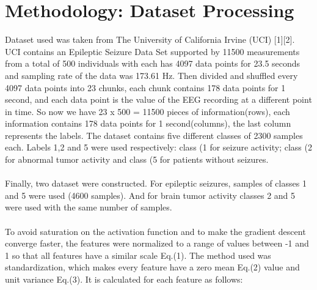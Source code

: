 \documentclass{llncs}       %
\begin{document}
\paragraph{}
\paragraph{}
\paragraph{}



\paragraph{}
\section{Methodology: Dataset Processing}
\label{sec:2}

Dataset used was taken from The University of California Irvine (UCI) [1][2].  UCI contains an Epileptic Seizure Data Set supported by 11500 measurements from a total of 500 individuals with each has 4097 data points for 23.5 seconds and sampling rate of the data was 173.61 Hz. Then divided and shuffled every 4097 data points into 23 chunks, each chunk contains 178 data points for 1 second, and each data point is the value of the EEG recording at a different point in time. So now we have 23 x 500 = 11500 pieces of information(rows), each information contains 178 data points for 1 second(columns), the last column represents the labels.  The dataset contains five different classes of 2300 samples each. Labels 1,2 and 5 were used respectively: class (1 for seizure activity; class (2 for abnormal tumor activity and class (5 for patients without seizures.  
\paragraph{}
Finally, two dataset were constructed.  For epileptic seizures, samples of classes 1 and 5 were used (4600 samples).  And for brain tumor activity classes 2 and 5 were used with the same number of samples.  
   
\paragraph{}

To avoid saturation on the activation function and to make the gradient descent converge faster, the features were normalized to a range of values between -1 and 1 so that all features have a similar scale Eq.(1). The method used was standardization, which makes every feature have a zero mean Eq.(2) value and unit variance Eq.(3). It is calculated for each feature as follows:
\end{document}
